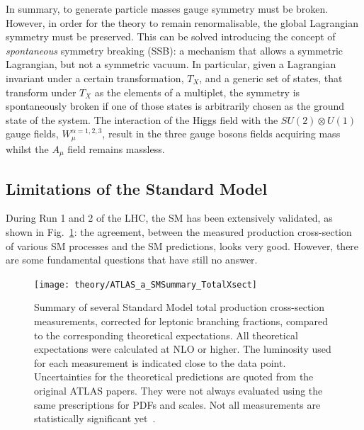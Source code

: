 			In summary, to generate particle masses gauge symmetry must be broken. However, in order for the theory to remain renormalisable, the global Lagrangian symmetry must be preserved. This can be solved introducing the concept of \emph{spontaneous} symmetry breaking (SSB): a mechanism that allows a symmetric Lagrangian, but not a symmetric vacuum. In particular, given a Lagrangian invariant under a certain transformation, $T_X$, and a generic set of states, that transform under $T_X$ as the elements of a multiplet, the symmetry is spontaneously broken if one of those states is arbitrarily chosen as the ground state of the system. 
			The interaction of the Higgs field with the $SU(2) \otimes U(1)$ gauge fields, $W_\mu^{\alpha =1,2,3}$, result in the three gauge bosons fields acquiring mass whilst the $A_\mu$ field remains massless. 



		\subsection{Limitations of the Standard Model}
		\label{sec:SMlim}

			During Run 1 and 2 of the LHC, the SM has been extensively validated, as shown in Fig.~\ref{fig:ATLAS_a_SMSummary_TotalXsect}: the agreement, between the measured production cross-section of various SM processes and the SM predictions, looks very good. However, there are some fundamental questions that have still no answer.

			\begin{figure}[!htb]
				\centering
				\texttt{[image: theory/ATLAS\_a\_SMSummary\_TotalXsect]}
				\caption{\label{fig:ATLAS_a_SMSummary_TotalXsect} Summary of several Standard Model total production cross-section measurements, corrected for leptonic branching fractions, compared to the corresponding theoretical expectations. All theoretical expectations were calculated at NLO or higher. The luminosity used for each measurement is indicated close to the data point. Uncertainties for the theoretical predictions are quoted from the original ATLAS papers. They were not always evaluated using the same prescriptions for PDFs and scales. Not all measurements are statistically significant yet~\cite{ATLAS_a_SMSummary_TotalXsect}.}
			\end{figure}



